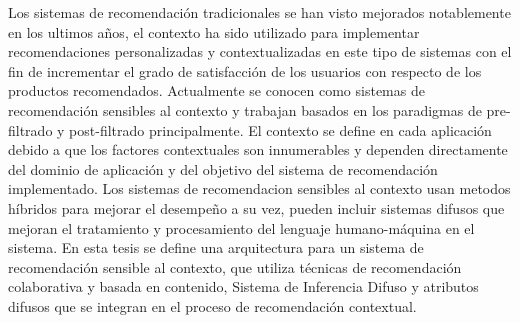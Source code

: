 

% 




Los sistemas de recomendaci\'on tradicionales se han visto mejorados
notablemente en los ultimos a\~{n}os, el contexto ha sido utilizado para
implementar recomendaciones personalizadas y contextualizadas en este
tipo de sistemas con el fin de incrementar el grado de satisfacci\'on de
los usuarios con respecto de los productos recomendados. Actualmente
se conocen como sistemas de recomendaci\'on sensibles al contexto y
trabajan basados en los paradigmas de pre-filtrado y post-filtrado
principalmente. El contexto se define en cada aplicaci\'on debido a que
los factores contextuales son innumerables y dependen directamente del
dominio de aplicaci\'on y del objetivo del sistema de recomendaci\'on
implementado.  
Los sistemas de recomendacion sensibles al contexto
usan metodos h\'ibridos para mejorar el desempe\~{n}o  a su vez, pueden
incluir sistemas difusos que mejoran el tratamiento y procesamiento
del lenguaje humano-m\'aquina en el sistema. En esta tesis se define una
arquitectura para un sistema de recomendaci\'on sensible al contexto,
que utiliza 
t\'ecnicas de recomendaci\'on colaborativa y basada en
contenido,  Sistema de Inferencia Difuso y atributos difusos que se
integran en el proceso de recomendaci\'on contextual. 




